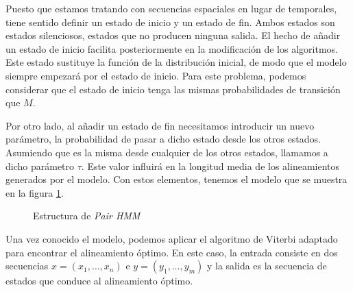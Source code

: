 Puesto que estamos tratando con secuencias espaciales en lugar de temporales, tiene sentido definir un estado de inicio y un estado de fin. Ambos estados son estados silenciosos, estados que no producen ninguna salida. El hecho de añadir un estado de inicio facilita posteriormente en la modificación de los algoritmos. Este estado sustituye la función de la distribución inicial, de modo que el modelo siempre empezará por el estado de inicio. Para este problema, podemos considerar que el estado de inicio tenga las mismas probabilidades de transición que $M$.

Por otro lado, al añadir un estado de fin necesitamos introducir un nuevo parámetro, la probabilidad de pasar a dicho estado desde los otros estados. Asumiendo que es la misma desde cualquier de los otros estados, llamamos a dicho parámetro $\tau$. Este valor influirá en la longitud media de los alineamientos generados por el modelo. Con estos elementos, tenemos el modelo que se muestra en la figura \ref{pairEjemplo}.

\begin{figure}
\centering
{}
\caption{Estructura de \textit{Pair HMM}}
\label{pairEjemplo}
\end{figure}
Una vez conocido el modelo, podemos aplicar el algoritmo de Viterbi adaptado para encontrar el alineamiento óptimo. En este caso, la entrada consiste en dos secuencias $x=(x_1,\dots,x_n)$ e $y=(y_1,\dots,y_m)$ y la salida es la secuencia de estados que conduce al alineamiento óptimo. 


